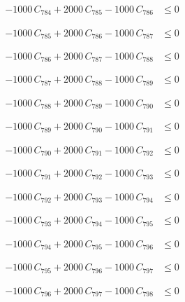 \documentclass[a4paper,11pt]{article}
\begin{document}
\begin{align}
-1000\,C_{784} + 2000\,C_{785} - 1000\,C_{786} &\leq 0 \nonumber
\end{align}

\begin{align}
-1000\,C_{785} + 2000\,C_{786} - 1000\,C_{787} &\leq 0 \nonumber
\end{align}

\begin{align}
-1000\,C_{786} + 2000\,C_{787} - 1000\,C_{788} &\leq 0 \nonumber
\end{align}

\begin{align}
-1000\,C_{787} + 2000\,C_{788} - 1000\,C_{789} &\leq 0 \nonumber
\end{align}

\begin{align}
-1000\,C_{788} + 2000\,C_{789} - 1000\,C_{790} &\leq 0 \nonumber
\end{align}

\begin{align}
-1000\,C_{789} + 2000\,C_{790} - 1000\,C_{791} &\leq 0 \nonumber
\end{align}

\begin{align}
-1000\,C_{790} + 2000\,C_{791} - 1000\,C_{792} &\leq 0 \nonumber
\end{align}

\begin{align}
-1000\,C_{791} + 2000\,C_{792} - 1000\,C_{793} &\leq 0 \nonumber
\end{align}

\begin{align}
-1000\,C_{792} + 2000\,C_{793} - 1000\,C_{794} &\leq 0 \nonumber
\end{align}

\begin{align}
-1000\,C_{793} + 2000\,C_{794} - 1000\,C_{795} &\leq 0 \nonumber
\end{align}

\begin{align}
-1000\,C_{794} + 2000\,C_{795} - 1000\,C_{796} &\leq 0 \nonumber
\end{align}

\begin{align}
-1000\,C_{795} + 2000\,C_{796} - 1000\,C_{797} &\leq 0 \nonumber
\end{align}

\begin{align}
-1000\,C_{796} + 2000\,C_{797} - 1000\,C_{798} &\leq 0 \nonumber
\end{align}
\end{document}

